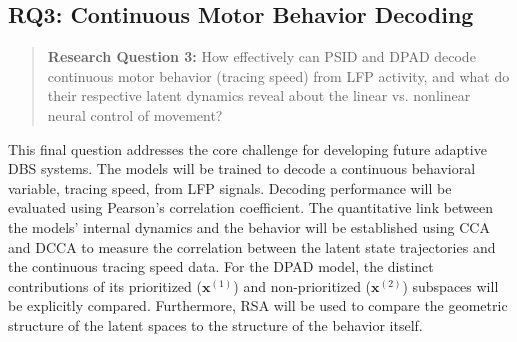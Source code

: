 \documentclass[12pt, a4paper]{article}
\begin{document}
\subsection{RQ3: Continuous Motor Behavior Decoding}
\begin{quote}
    \textbf{Research Question 3:} How effectively can PSID and DPAD decode continuous motor behavior (tracing speed) from LFP activity, and what do their respective latent dynamics reveal about the linear vs. nonlinear neural control of movement?
\end{quote}

This final question addresses the core challenge for developing future adaptive DBS systems. The models will be trained to decode a continuous behavioral variable, tracing speed, from LFP signals. Decoding performance will be evaluated using Pearson's correlation coefficient. The quantitative link between the models' internal dynamics and the behavior will be established using CCA and DCCA to measure the correlation between the latent state trajectories and the continuous tracing speed data. For the DPAD model, the distinct contributions of its prioritized ($\mathbf{x}^{(1)}$) and non-prioritized ($\mathbf{x}^{(2)}$) subspaces will be explicitly compared. Furthermore, RSA will be used to compare the geometric structure of the latent spaces to the structure of the behavior itself.
\end{document}
